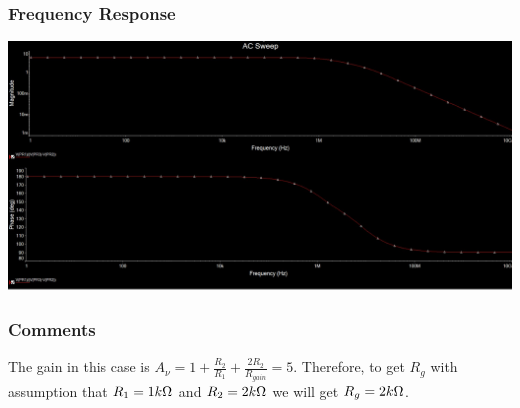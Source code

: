 \documentclass[a4paper, 12pt, english]{article}
\newenvironment{Figure}
  {\par\medskip\noindent\minipage{\linewidth}}
  {\endminipage\par\medskip}
\begin{document}
\subsubsection{Frequency Response}
\begin{Figure}
 \centering
 \includegraphics[width=1.2\linewidth, scale=2]{images/2ampsFR.png}
\end{Figure}

\subsubsection{Comments}
The gain in this case is \(A_{\nu}=1+\frac{R_{2}}{R_{1}}+\frac{2R_{2}}{R_{gain}} = 5\). Therefore, to get $R_{g}$ with assumption that $R_{1} = 1k\ohm$ and $R_{2} = 2k\ohm$ we will get $R_{g} = 2k\ohm$.


\patchcmd{\thebibliography}{\section*}{\section}{}{}
\end{document}
